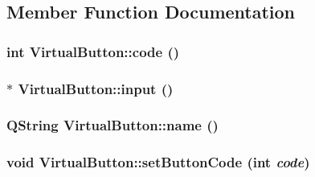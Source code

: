\subsection{Member Function Documentation}
\hypertarget{class_virtual_button_807d21790a5cfa564b1e20d28f900051}{
\subsubsection[{code}]{\setlength{\rightskip}{0pt plus 5cm}int VirtualButton::code ()}}
\label{class_virtual_button_807d21790a5cfa564b1e20d28f900051}


\hypertarget{class_virtual_button_1c67f8dec41ff21d0aa5c07225771e07}{
\subsubsection[{input}]{$\ast$ VirtualButton::input ()}}
\label{class_virtual_button_1c67f8dec41ff21d0aa5c07225771e07}


\hypertarget{class_virtual_button_6a5bdaf694c545e88225f9aff3a89d78}{
\subsubsection[{name}]{\setlength{\rightskip}{0pt plus 5cm}QString VirtualButton::name ()}}
\label{class_virtual_button_6a5bdaf694c545e88225f9aff3a89d78}


\hypertarget{class_virtual_button_fb49f0be2e423669ed4ef30e2d4c11a4}{
\subsubsection[{setButtonCode}]{\setlength{\rightskip}{0pt plus 5cm}void VirtualButton::setButtonCode (int {\em code})}}
\label{class_virtual_button_fb49f0be2e423669ed4ef30e2d4c11a4}



